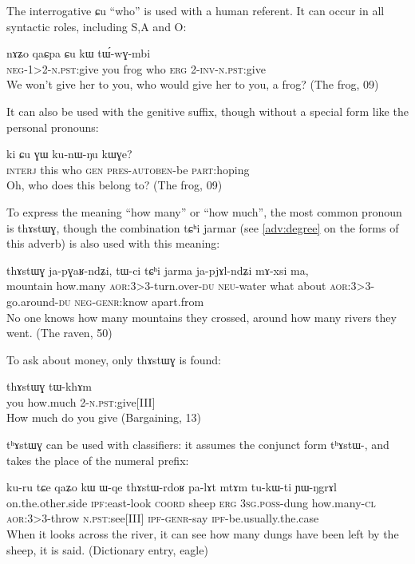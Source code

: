 \documentclass[oldfontcommands,oneside,a4paper,11pt]{memoir}
\newcommand{\ipa}[1]{{\phon #1}} %
\newcommand{\aor}{\textsc{aor}}
\newcommand{\auto}{\textsc{autoben}}
\newcommand{\coord}{\textsc{coord}}
\newcommand{\du}{\textsc{du}}
\newcommand{\erg}{\textsc{erg}}
\newcommand{\gen}{\textsc{gen}}
\newcommand{\genr}{\textsc{genr}}
\newcommand{\inv}{\textsc{inv}}
\newcommand{\ipf}{\textsc{ipf}}
\newcommand{\negat}{\textsc{neg}}
\newcommand{\neu}{\textsc{neu}}
\newcommand{\npst}{\textsc{n.pst}}
\newcommand{\poss}{\textsc{poss}}
\newcommand{\pres}{\textsc{pres}}
\newcommand{\sg}{\textsc{sg}}
\begin{document}
The interrogative \ipa{ɕu} ``who'' is used with a human referent. It can occur in all syntactic roles, including S,A and O:
\begin{exe}
\ex
\gll  \ipa{mɤ-ta-mbi} 	\ipa{nɤʑo} 	\ipa{qaɕpa} 	\ipa{ɕu} 	\ipa{kɯ} 	\ipa{tɯ́-wɣ-mbi}    \\
 \negat{}-1>2-\npst{}:give you frog who \erg{} 2-\inv{}-\npst{}:give \\
\glt We won't give her to you, who would give her to you, a frog?   (The frog, 09)
\end{exe} 

It can also be used with the genitive suffix, though without a special form like the personal pronouns:
\begin{exe}
\ex
\gll  \ipa{χawo!} 	\ipa{ki} 	\ipa{ɕu} 	\ipa{ɣɯ} 	\ipa{ku-nɯ-ŋu} 	\ipa{kɯɣe?}    \\
 \textsc{interj} this who \gen{} \pres{}-\auto{}-be  \textsc{part}:hoping \\
\glt Oh, who does this belong to? (The frog, 09)
\end{exe}  



To express the meaning ``how many'' or ``how much'', the most common pronoun is \ipa{thɤstɯɣ}, though the combination \ipa{tɕʰi jarmar} (see \ref{adv:degree} on the forms of this adverb) is also used with this meaning:


\begin{exe}
\ex
\gll  \ipa{zgo} 	\ipa{thɤstɯɣ} 	\ipa{ja-pɣaʁ-ndʑi,} 	\ipa{tɯ-ci} 	\ipa{tɕʰi} 	\ipa{jarma} 	\ipa{ja-pjɤl-ndʑi} 	\ipa{mɤ-xsi} 	\ipa{ma,}       \\
 mountain how.many \aor{}:3>3-turn.over-\du{} \neu{}-water what about \aor{}:3>3-go.around-\du{} \negat{}-\genr{}:know apart.from \\
\glt No one knows how many mountains they crossed, around how many rivers they went.  (The raven, 50)
\end{exe}  
  
To ask about money, only 	\ipa{thɤstɯɣ}  is found:

\begin{exe}
\ex
 \gll    \ipa{nɤʑo} 	\ipa{thɤstɯɣ} 	\ipa{tɯ-khɤm}    \\
 you how.much 2-\npst{}:give[III]  \\
\glt  How much do you give (Bargaining, 13)
\end{exe} 

	\ipa{tʰɤstɯɣ} can be used with classifiers: it assumes the conjunct form \ipa{tʰɤstɯ-}, and takes the place of the numeral prefix:
 \begin{exe}
\ex
 \gll   \ipa{phɤri} 	\ipa{ku-ru} 	\ipa{tɕe} 	\ipa{qaʑo} 	\ipa{kɯ} 	\ipa{ɯ-qe} 	\ipa{thɤstɯ-rdoʁ} 	\ipa{pa-lɤt} 	\ipa{mtɤm} 	\ipa{tu-kɯ-ti} 	\ipa{ɲɯ-ŋgrɤl}   \\
  on.the.other.side \ipf{}:east-look \coord{} sheep \erg{} 3\sg{}.\poss{}-dung how.many-\textsc{cl} \aor{}:3>3-throw \npst{}:see[III] \ipf{}-\genr{}-say \ipf{}-be.usually.the.case \\
\glt When it looks across the river, it can see how many dungs have been left by the sheep, it is said.  (Dictionary entry, eagle)
\end{exe} 
\end{document}
